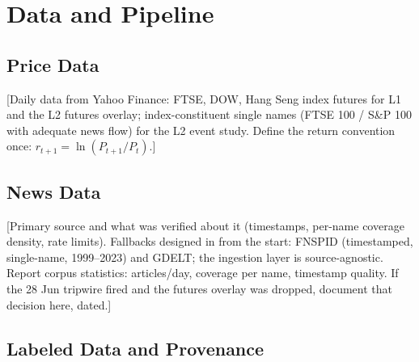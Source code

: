 %
%
%
\chapter{Data and Pipeline}
\label{ch:data}

\section{Price Data}
\label{sec:data-prices}

[Daily data from Yahoo Finance: FTSE, DOW, Hang Seng index futures for
L1 and the L2 futures overlay; index-constituent single names (FTSE 100
/ S\&P 100 with adequate news flow) for the L2 event study. Define the
return convention once: $r_{t+1} = \ln(P_{t+1}/P_t)$.]

\section{News Data}
\label{sec:data-news}

[Primary source and what was verified about it (timestamps, per-name
coverage density, rate limits). Fallbacks designed in from the start:
FNSPID \parencite{dong2024fnspid} (timestamped, single-name, 1999--2023)
and GDELT; the ingestion layer is source-agnostic. Report corpus
statistics: articles/day, coverage per name, timestamp quality. If the
28 Jun tripwire fired and the futures overlay was dropped, document
that decision here, dated.]

\section{Labeled Data and Provenance}
\label{sec:data-labeled}

